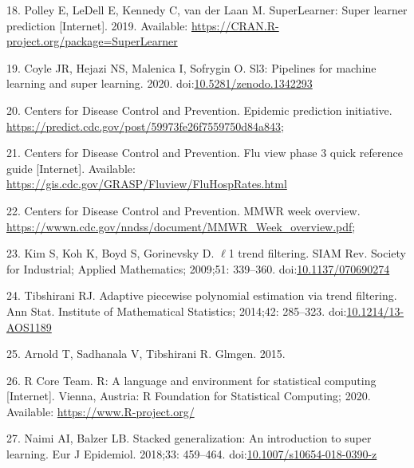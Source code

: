 \documentclass[10pt,letterpaper]{article}
\begin{document}
\leavevmode\hypertarget{ref-Polley2019-sl}{}%
18. Polley E, LeDell E, Kennedy C, van der Laan M. SuperLearner: Super
learner prediction {[}Internet{]}. 2019. Available:
\url{https://CRAN.R-project.org/package=SuperLearner}

\leavevmode\hypertarget{ref-Coyle2020-ze}{}%
19. Coyle JR, Hejazi NS, Malenica I, Sofrygin O. Sl3: Pipelines for
machine learning and super learning. 2020.
doi:\href{https://doi.org/10.5281/zenodo.1342293}{10.5281/zenodo.1342293}

\leavevmode\hypertarget{ref-Centers_for_Disease_Control_and_Prevention_undated-tx}{}%
20. Centers for Disease Control and Prevention. Epidemic prediction
initiative. \url{https://predict.cdc.gov/post/59973fe26f7559750d84a843};

\leavevmode\hypertarget{ref-Centers_for_Disease_Control_and_Prevention_undated-vt}{}%
21. Centers for Disease Control and Prevention. Flu view phase 3 quick
reference guide {[}Internet{]}. Available:
\url{https://gis.cdc.gov/GRASP/Fluview/FluHospRates.html}

\leavevmode\hypertarget{ref-Centers_for_Disease_Control_and_Prevention_undated-pu}{}%
22. Centers for Disease Control and Prevention. MMWR week overview.
\url{https://wwwn.cdc.gov/nndss/document/MMWR_Week_overview.pdf};

\leavevmode\hypertarget{ref-Kim2009-bz}{}%
23. Kim S, Koh K, Boyd S, Gorinevsky D. \(\ell\)1 trend filtering. SIAM
Rev. Society for Industrial; Applied Mathematics; 2009;51: 339--360.
doi:\href{https://doi.org/10.1137/070690274}{10.1137/070690274}

\leavevmode\hypertarget{ref-Tibshirani2014-tr}{}%
24. Tibshirani RJ. Adaptive piecewise polynomial estimation via trend
filtering. Ann Stat. Institute of Mathematical Statistics; 2014;42:
285--323.
doi:\href{https://doi.org/10.1214/13-AOS1189}{10.1214/13-AOS1189}

\leavevmode\hypertarget{ref-Arnold2015-tb}{}%
25. Arnold T, Sadhanala V, Tibshirani R. Glmgen. 2015.

\leavevmode\hypertarget{ref-RCore2020-ct}{}%
26. R Core Team. R: A language and environment for statistical computing
{[}Internet{]}. Vienna, Austria: R Foundation for Statistical Computing;
2020. Available: \url{https://www.R-project.org/}

\leavevmode\hypertarget{ref-Naimi2018-fv}{}%
27. Naimi AI, Balzer LB. Stacked generalization: An introduction to
super learning. Eur J Epidemiol. 2018;33: 459--464.
doi:\href{https://doi.org/10.1007/s10654-018-0390-z}{10.1007/s10654-018-0390-z}

\nolinenumbers
\end{document}
